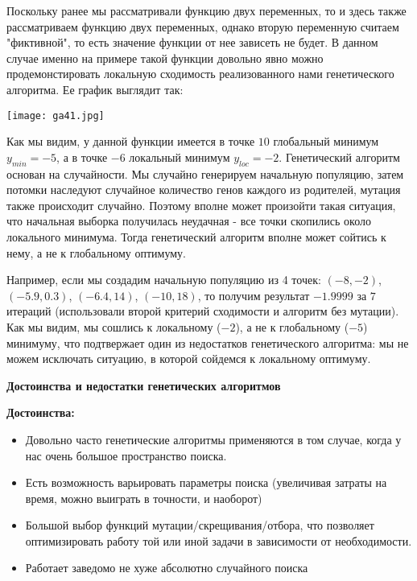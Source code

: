 \documentclass[a4paper,11pt,russian]{article}
\begin{document}
Поскольку ранее мы рассматривали функцию двух переменных, то и здесь также рассматриваем функцию двух переменных, однако вторую переменную считаем "фиктивной", то есть значение функции от нее зависеть не будет. В данном случае именно на примере такой функции довольно явно можно продемонстировать локальную сходимость реализованного нами генетического алгоритма. Ее график выглядит так:

{\texttt{[image: ga41.jpg]}}

Как мы видим, у данной функции имеется в точке $10$ глобальный минимум $y_{min} = -5$, а в точке $-6$ локальный минимум $y_{loc} = -2$. Генетический алгоритм основан на случайности. Мы случайно генерируем начальную популяцию, затем потомки наследуют случайное количество генов каждого из родителей, мутация также происходит случайно. Поэтому вполне может произойти такая ситуация, что начальная выборка получилась неудачная - все точки скопились около локального минимума. Тогда генетический алгоритм вполне может сойтись к нему, а не к глобальному оптимуму.

Например, если мы создадим начальную популяцию из 4 точек: $(-8, -2)$, $(-5.9, 0.3)$, $(-6.4, 14)$, $(-10, 18)$, то получим результат $-1.9999$ за $7$ итераций (использовали второй критерий сходимости и алгоритм без мутации). Как мы видим, мы сошлись к локальному ($-2$), а не к глобальному ($-5$) минимуму, что подтвержает один из недостатков генетического алгоритма: мы не можем исключать ситуацию, в которой сойдемся к локальному оптимуму.

\hfill \break
\textbf{Достоинства и недостатки генетических алгоритмов}

\textbf{Достоинства:}
\begin{itemize}
\item Довольно часто генетические алгоритмы применяются в том случае, когда у нас очень большое пространство поиска. 
\item Есть возможность варьировать параметры поиска (увеличивая затраты на время, можно выиграть в точности, и наоборот)
\item Большой выбор функций мутации/скрещивания/отбора, что позволяет оптимизировать работу той или иной задачи в зависимости от необходимости.
\item Работает заведомо не хуже абсолютно случайного поиска
\end{itemize}
\end{document}
